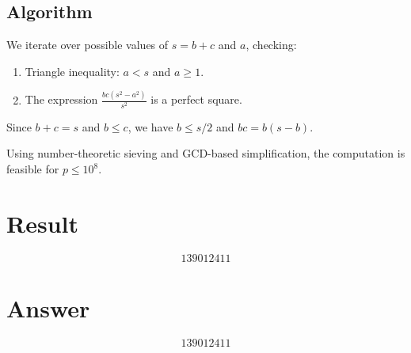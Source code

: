 \documentclass[12pt]{article}
\begin{document}
\subsection{Algorithm}

We iterate over possible values of $s = b+c$ and $a$, checking:
\begin{enumerate}
    \item Triangle inequality: $a < s$ and $a \ge 1$.
    \item The expression $\frac{bc(s^2 - a^2)}{s^2}$ is a perfect square.
\end{enumerate}

Since $b + c = s$ and $b \le c$, we have $b \le s/2$ and $bc = b(s-b)$.

Using number-theoretic sieving and GCD-based simplification, the computation is feasible for $p \le 10^8$.

\section{Result}

\[
\boxed{139012411}
\]

\section{Answer}

\[
\boxed{139012411}
\]
\end{document}
